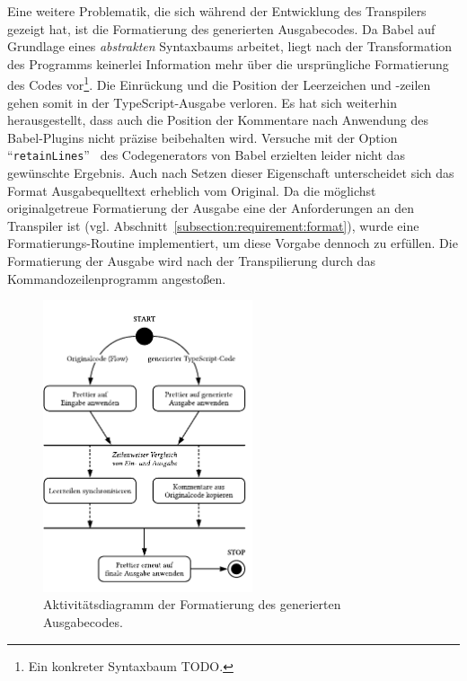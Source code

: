 Eine weitere Problematik, die sich während der Entwicklung des Transpilers gezeigt hat, ist die Formatierung des generierten Ausgabecodes. Da Babel auf Grundlage eines \emph{abstrakten} Syntaxbaums arbeitet, liegt nach der Transformation des Programms keinerlei Information mehr über die ursprüngliche Formatierung des Codes vor\footnote{Ein konkreter Syntaxbaum TODO.}. Die Einrückung und die Position der Leerzeichen und -zeilen gehen somit in der TypeScript-Ausgabe verloren. Es hat sich weiterhin herausgestellt, dass auch die Position der Kommentare nach Anwendung des Babel-Plugins nicht präzise beibehalten wird. Versuche mit der Option \enquote{\texttt{retainLines}}~\autocite{BABEL:GENERATOR} des Codegenerators von Babel erzielten leider nicht das gewünschte Ergebnis. Auch nach Setzen dieser Eigenschaft unterscheidet sich das Format Ausgabequelltext erheblich vom Original. Da die möglichst originalgetreue Formatierung der Ausgabe eine der Anforderungen an den Transpiler ist (vgl. Abschnitt~\ref{subsection:requirement:format}), wurde eine Formatierungs-Routine implementiert, um diese Vorgabe dennoch zu erfüllen. Die Formatierung der Ausgabe wird nach der Transpilierung durch das Kommandozeilenprogramm angestoßen.

\begin{figure}[htbp]
  \centering
  \includegraphics[width=0.55\textwidth]{src/4_Umsetzung/fig/activity-diagram-formatting.pdf}
	\caption[Aktivitätsdiagramm der Formatierung des Ausgabecodes]{Aktivitätsdiagramm der Formatierung des generierten Ausgabecodes.}
	\label{fig:activity-diagram-formatting}
\end{figure}

